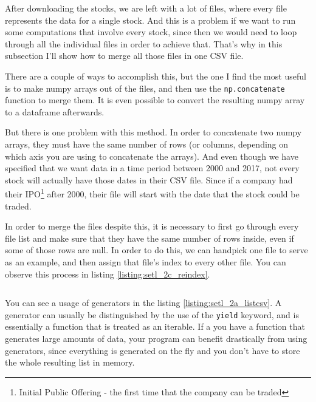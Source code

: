 \documentclass[12pt, a4paper]{article}
\begin{document}
\bgroup
  \inputminted[linenos, breaklines=true, fontsize=\scriptsize]{python}{src/stocks/etl/1_download.py}
  \label{listing:setl_1_download}
\egroup


After downloading the stocks, we are left with a lot of files, where every file represents the data for a single stock. And this is a problem if we want to run some computations that involve every stock, since then we would need to loop through all the individual files in order to achieve that. That’s why in this subsection I’ll show how to merge all those files in one CSV file.

There are a couple of ways to accomplish this, but the one I find the most useful is to make numpy arrays out of the files, and then use the \texttt{np.concatenate} function to merge them. It is even possible to convert the resulting numpy array to a dataframe afterwards.

But there is one problem with this method. In order to  concatenate two numpy arrays, they must have the same number of rows (or columns, depending on which axis you are using to concatenate the arrays). And even though we have specified that we want data in a time period between 2000 and 2017, not every stock will actually have those dates in their CSV file. Since if a company had their IPO\footnote{Initial Public Offering - the first time that the company can be traded} after 2000, their file will start with the date that the stock could be traded.

In order to merge the files despite this, it is necessary to first go through every file list and make sure that they have the same number of rows inside, even if some of those rows are null. In order to do this, we can handpick one file to serve as an example, and then assign that file’s index to every other file. You can observe this process in listing \ref{listing:setl_2c_reindex}.

\bgroup
  \inputminted[linenos, breaklines=true, fontsize=\scriptsize, firstnumber=last]{python}{src/stocks/etl/2b_timearr.py}
  \label{listing:setl_2b_timearr}
\egroup

You can see a usage of generators in the listing \ref{listing:setl_2a_listcsv}. A generator can usually be distinguished by the use of the \texttt{yield} keyword, and is essentially a function that is treated as an iterable. If a you have a function that generates large amounts of data, your program can benefit drastically from using generators, since everything is generated on the fly and you don't have to store the whole resulting list in memory.
\end{document}
